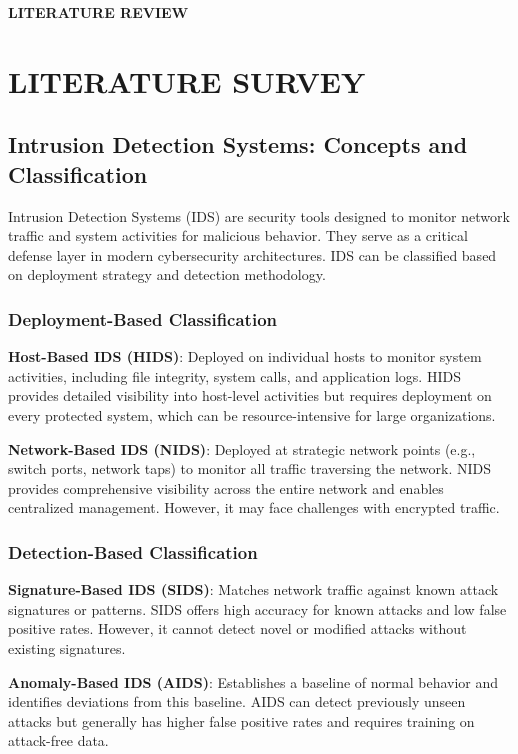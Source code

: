 \documentclass[12pt,a4paper]{report}
\newcommand{\chapterdivider}[1]{%
    \clearpage
    \thispagestyle{empty}
    \vspace*{\fill}
    \begin{center}
        \Huge\bfseries\color{mydarkblue} #1
    \end{center}
    \vspace*{\fill}
    \clearpage
}
\begin{document}
\chapterdivider{LITERATURE REVIEW}

\chapter{LITERATURE SURVEY}

\section{Intrusion Detection Systems: Concepts and Classification}

Intrusion Detection Systems (IDS) are security tools designed to monitor network traffic and system activities for malicious behavior. They serve as a critical defense layer in modern cybersecurity architectures. IDS can be classified based on deployment strategy and detection methodology.

\subsection{Deployment-Based Classification}

\textbf{Host-Based IDS (HIDS)}: Deployed on individual hosts to monitor system activities, including file integrity, system calls, and application logs. HIDS provides detailed visibility into host-level activities but requires deployment on every protected system, which can be resource-intensive for large organizations.

\textbf{Network-Based IDS (NIDS)}: Deployed at strategic network points (e.g., switch ports, network taps) to monitor all traffic traversing the network. NIDS provides comprehensive visibility across the entire network and enables centralized management. However, it may face challenges with encrypted traffic.

\subsection{Detection-Based Classification}

\textbf{Signature-Based IDS (SIDS)}: Matches network traffic against known attack signatures or patterns. SIDS offers high accuracy for known attacks and low false positive rates. However, it cannot detect novel or modified attacks without existing signatures.

\textbf{Anomaly-Based IDS (AIDS)}: Establishes a baseline of normal behavior and identifies deviations from this baseline. AIDS can detect previously unseen attacks but generally has higher false positive rates and requires training on attack-free data.
\end{document}
